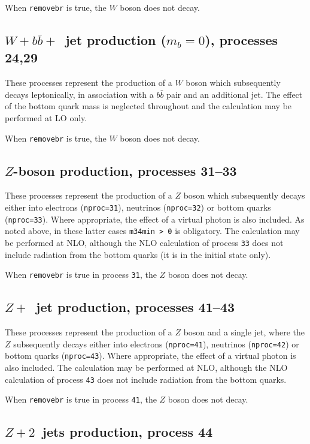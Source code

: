 \documentclass[12pt]{article}
\begin{document}
When {\tt removebr} is true, the $W$ boson does not decay.

\subsection{$W+b{\bar b}+$~jet production ($m_b=0$), processes 24,29}
\label{subsec:wbbjetmassless}

These processes represent the production of a $W$ boson which subsequently
decays leptonically, in association with a $b{\bar b}$ pair and an
additional jet. The effect of the bottom quark mass is neglected throughout
and the calculation may be performed at LO only.

When {\tt removebr} is true, the $W$ boson does not decay.

\subsection{$Z$-boson production, processes 31--33}
\label{subsec:zboson}

These processes represent the production of a $Z$ boson which subsequently
decays either into electrons ({\tt nproc=31}), neutrinos ({\tt nproc=32})
or bottom quarks ({\tt nproc=33}). Where appropriate, the effect of a virtual
photon is also included. As noted above, in these latter cases {\tt m34min > 0}
is obligatory. The calculation may be performed at NLO,
although the NLO calculation of process {\tt 33} does not include radiation
from the bottom quarks (it is in the initial state only).

When {\tt removebr} is true in process {\tt 31}, the $Z$ boson does not decay.

\subsection{$Z+$~jet production, processes 41--43}
\label{subsec:zjet}

These processes represent the production of a $Z$ boson and a single jet,
where the $Z$ subsequently
decays either into electrons ({\tt nproc=41}), neutrinos ({\tt nproc=42})
or bottom quarks ({\tt nproc=43}). Where appropriate, the effect of a virtual
photon is also included. The calculation may be performed at NLO,
although the NLO calculation of process {\tt 43} does not include radiation
from the bottom quarks.

When {\tt removebr} is true in process {\tt 41}, the $Z$ boson does not decay.

\subsection{$Z+2$~jets production, process 44}
\label{subsec:z2jets}
\end{document}
